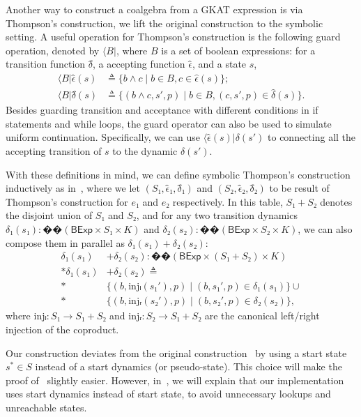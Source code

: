 \documentclass[conference]{IEEEtran}
\newcommand{\theoryOf}[1]{\ensuremath{\mathsf{#1}}}
\newcommand{\BExp}{\theoryOf{BExp}}
\begin{document}
Another way to construct a coalgebra from a GKAT expression is via Thompson's construction, we lift the original construction to the symbolic setting.
A useful operation for Thompson's construction is the following guard operation, denoted by \(⟨B|\), where \(B\) is a set of boolean expressions: for a transition function \(δ̂\), a accepting function \(ϵ̂\), and a state \(s\),
\begin{align*}
    ⟨B|ϵ̂(s) & ≜ \{b ∧ c ∣ b ∈ B, c ∈ \hat{\epsilon}(s)\}; \\
    ⟨B|δ̂(s) & ≜ \{(b ∧ c, s', p) ∣ b ∈ B, (c, s', p) ∈ \hat{\delta}(s)\}.
\end{align*}
Besides guarding transition and acceptance with different conditions in if statements and while loops, the guard operator can also be used to simulate uniform continuation. Specifically, we can use \(⟨ϵ̂(s)|δ(s')\) to connecting all the accepting transition of \(s\) to the dynamic \(δ(s')\).

With these definitions in mind, we can define symbolic Thompson's construction inductively as in~, where we let \((S₁, ϵ̂₁, δ̂₁)\) and \((S₂, ϵ̂₂, δ̂₂)\) to be result of Thompson's construction for \(e₁\) and \(e₂\) respectively.
In this table, \(S₁ + S₂\) denotes the disjoint union of \(S₁\) and \(S₂\), and for any two transition dynamics \(δ₁(s₁): ��(\BExp × S₁ × K)\) and \(δ₂(s₂): ��(\BExp × S₂ × K)\), we can also compose them in parallel as \(δ₁(s₁) + δ₂(s₂)\):
\begin{align*}
    δ₁(s₁) & + δ₂(s₂): ��(\BExp × (S₁ + S₂) × K) \\*
    δ₁(s₁) & + δ₂(s₂) ≜ \\*
        & \{(b, \mathrm{inj}ₗ(s₁'), p) ∣ (b, s₁', p) ∈ δ₁(s₁)\} ∪ \\*
        & \{(b, \mathrm{inj}ᵣ(s₂'), p) ∣ (b, s₂', p) ∈ δ₂(s₂)\},
\end{align*}
where \(\mathrm{inj}ₗ: S₁ → S₁ + S₂\) and \(\mathrm{inj}ᵣ: S₂ → S₁ + S₂\) are the canonical left/right injection of the coproduct.

Our construction deviates from the original construction~\cite{smolka_GuardedKleeneAlgebra_2020} by using a start state \(s^* ∈ S\) instead of a start dynamics (or pseudo-state).
This choice will make the proof of~ slightly easier. 
However, in~, we will explain that our implementation uses start dynamics instead of start state, to avoid unnecessary lookups and unreachable states.
\end{document}
